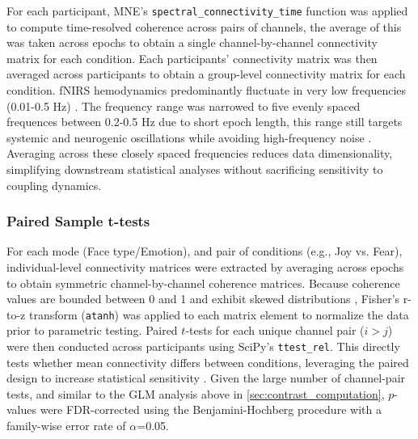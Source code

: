 For each participant, MNE's \texttt{spectral\_connectivity\_time} function was applied to compute time-resolved coherence across pairs of channels, the average of this was taken across epochs to obtain a single channel-by-channel connectivity matrix for each condition.
Each participants' connectivity matrix was then averaged across participants to obtain a group-level connectivity matrix for each condition. 
fNIRS hemodynamics predominantly fluctuate in very low frequencies (0.01-0.5 Hz) \citep{reddy_evaluation_2021}. 
The frequency range was narrowed to five evenly spaced frequences between 0.2-0.5 Hz due to short epoch length, this range still targets systemic and neurogenic oscillations while avoiding high-frequency noise \citep{xu_functional_2017}.
Averaging across these closely spaced frequencies reduces data dimensionality, simplifying downstream statistical analyses without sacrificing sensitivity to coupling dynamics. 

\subsubsection{Paired Sample t-tests}
For each mode (Face type/Emotion), and pair of conditions (e.g., Joy vs. Fear), individual-level connectivity matrices were extracted by averaging across epochs to obtain symmetric channel-by-channel coherence matrices. 
Because coherence values are bounded between 0 and 1 and exhibit skewed distributions \citep{miranda_de_sa_coherence_2009}, Fisher's r-to-z transform (\texttt{atanh}) was applied to each matrix element to normalize the data prior to parametric testing. 
Paired $t$-tests for each unique channel pair ($i > j$) were then conducted across participants using SciPy's \texttt{ttest\_rel}.
This directly tests whether mean connectivity differs between conditions, leveraging the paired design to increase statistical sensitivity \citep{hu_characterizing_2023}. 
Given the large number of channel-pair tests, and similar to the GLM analysis above in \ref{sec:contrast_computation}, $p$-values were FDR-corrected using the Benjamini-Hochberg procedure \citep{singh_exploring_2006} with a family-wise error rate of $\alpha$=0.05.

